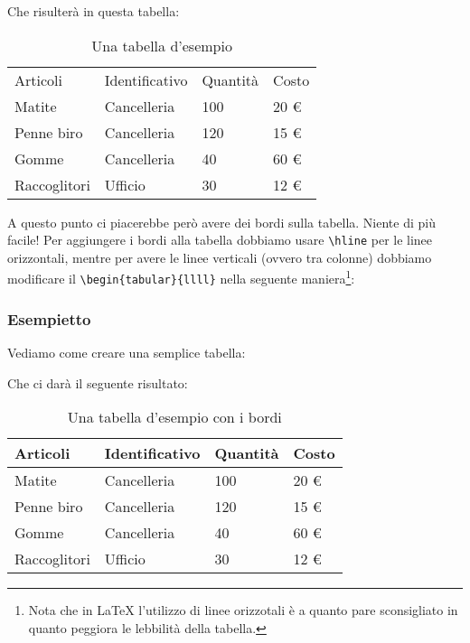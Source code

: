Che risulterà in questa tabella: 
\begin{table}[H]
\centering
\begin{tabular}{llll}
Articoli      & Identificativo & Quantità & Costo \\
Matite        & Cancelleria    & 100      & 20 \euro{}\\
Penne biro    & Cancelleria    & 120      & 15 \euro{}\\
Gomme         & Cancelleria    & 40       & 60 \euro{}\\
Raccoglitori  & Ufficio        & 30       & 12 \euro{} 
\end{tabular}
\caption{Una tabella d'esempio}
\label{tabella:esempio}
\end{table}

A questo punto ci piacerebbe però avere dei bordi sulla tabella. Niente di più 
facile! Per aggiungere i bordi alla tabella dobbiamo usare \verb!\hline! per le 
linee orizzontali, mentre per avere le linee verticali (ovvero tra colonne) 
dobbiamo modificare il \verb!\begin{tabular}{llll}! nella seguente 
maniera\footnote{Nota che in \LaTeX{} l'utilizzo di linee orizzotali è a 
quanto pare sconsigliato in quanto peggiora le lebbilità della tabella.}:

\vspace{\abovedisplayskip}
\begin{minipage}{\linewidth}
  \subsubsection{Esempietto}
  
  Vediamo come creare una semplice tabella:
  


\end{minipage}
\vspace{\belowdisplayskip}

Che ci darà il seguente risultato:

\begin{table}[H]
\centering
\begin{tabular}{|l|l|l|l|}
\hline
Articoli      & Identificativo & Quantità & Costo \\
\hline
Matite        & Cancelleria    & 100      & 20 \euro{}\\
\hline
Penne biro    & Cancelleria    & 120      & 15 \euro{}\\
\hline
Gomme         & Cancelleria    & 40       & 60 \euro{}\\
\hline
Raccoglitori  & Ufficio        & 30       & 12 \euro{}\\
\hline
\end{tabular}
\caption{Una tabella d'esempio con i bordi}
\label{tabella:esempio2}
\end{table}


